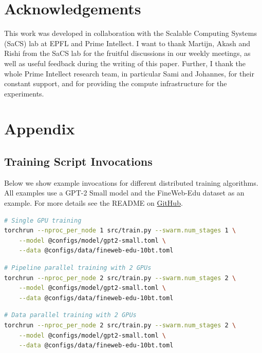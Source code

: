 \documentclass{article}
\newcommand{\github}{\href{https://github.com/mikasenghaas/diloco-swarm}{GitHub}}
\begin{document}
\section*{Acknowledgements}
\label{sec:acknowledgements}

This work was developed in collaboration with the Scalable Computing Systems
(SaCS) lab at EPFL and Prime Intellect. I want to thank Martijn, Akash and Rishi from the SaCS lab for the fruitful discussions in our weekly meetings, as well as useful feedback during the writing of this paper. Further, I thank the whole Prime Intellect research team, in particular Sami and Johannes, for their constant support, and for providing the compute infrastructure for the experiments.




\newpage
\appendix
\onecolumn

\section{Appendix}

\subsection{Training Script Invocations}

Below we show example invocations for different distributed training algorithms.
All examples use a GPT-2 Small model and the FineWeb-Edu dataset as an example.
For more details see the README on \github.

\begin{lstlisting}[language=bash]
# Single GPU training
torchrun --nproc_per_node 1 src/train.py --swarm.num_stages 1 \
    --model @configs/model/gpt2-small.toml \
    --data @configs/data/fineweb-edu-10bt.toml
\end{lstlisting}

\begin{lstlisting}[language=bash]
# Pipeline parallel training with 2 GPUs
torchrun --nproc_per_node 2 src/train.py --swarm.num_stages 2 \
    --model @configs/model/gpt2-small.toml \
    --data @configs/data/fineweb-edu-10bt.toml
\end{lstlisting}

\begin{lstlisting}[language=bash]
# Data parallel training with 2 GPUs
torchrun --nproc_per_node 2 src/train.py --swarm.num_stages 2 \
    --model @configs/model/gpt2-small.toml \
    --data @configs/data/fineweb-edu-10bt.toml
\end{lstlisting}
\end{document}
